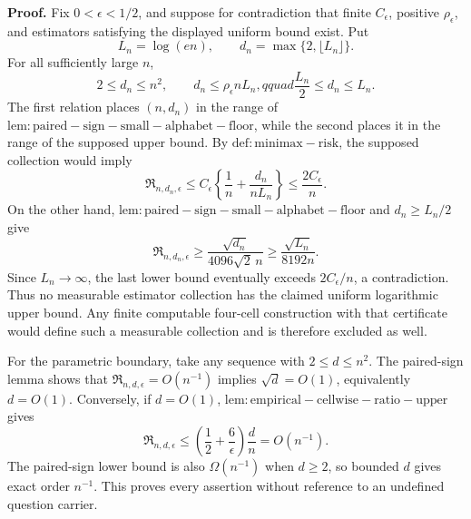 \textbf{Proof.}
Fix \(0<\epsilon<1/2\), and suppose for contradiction that finite \(C_\epsilon\), positive \(\rho_\epsilon\), and estimators satisfying the displayed uniform bound exist.  Put
\[
 L_n=\log(en),\qquad d_n=\max\{2,\lfloor L_n\rfloor\}.
\]
For all sufficiently large \(n\),
\[
 2\le d_n\le n^2,\qquad
 d_n\le\rho_\epsilon nL_n,qquad
 \frac{L_n}{2}\le d_n\le L_n.
\]
The first relation places \((n,d_n)\) in the range of \(\mathrm{lem:paired-sign-small-alphabet-floor}\), while the second places it in the range of the supposed upper bound.  By \(\mathrm{def:minimax-risk}\), the supposed collection would imply
\[
 \mathfrak R_{n,d_n,\epsilon}
 \le C_\epsilon\left\{\frac1n+
       \frac{d_n}{nL_n}\right\}
 \le\frac{2C_\epsilon}{n}.
\]
On the other hand, \(\mathrm{lem:paired-sign-small-alphabet-floor}\) and \(d_n\ge L_n/2\) give
\[
 \mathfrak R_{n,d_n,\epsilon}
 \ge\frac{\sqrt{d_n}}{4096\sqrt2\,n}
 \ge\frac{\sqrt{L_n}}{8192n}.
\]
Since \(L_n\to\infty\), the last lower bound eventually exceeds \(2C_\epsilon/n\), a contradiction.  Thus no measurable estimator collection has the claimed uniform logarithmic upper bound.  Any finite computable four-cell construction with that certificate would define such a measurable collection and is therefore excluded as well.

For the parametric boundary, take any sequence with \(2\le d\le n^2\).  The paired-sign lemma shows that \(\mathfrak R_{n,d,\epsilon}=O(n^{-1})\) implies \(\sqrt d=O(1)\), equivalently \(d=O(1)\).  Conversely, if \(d=O(1)\), \(\mathrm{lem:empirical-cellwise-ratio-upper}\) gives
\[
 \mathfrak R_{n,d,\epsilon}
 \le \left(\frac12+\frac6\epsilon\right)\frac dn
 =O(n^{-1}).
\]
The paired-sign lower bound is also \(\Omega(n^{-1})\) when \(d\ge2\), so bounded \(d\) gives exact order \(n^{-1}\).  This proves every assertion without reference to an undefined question carrier.